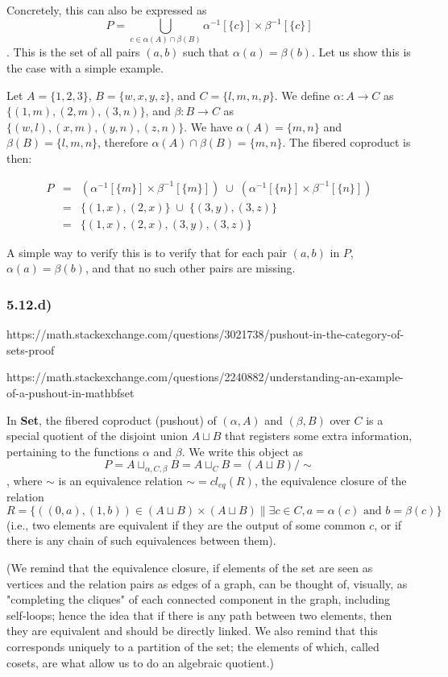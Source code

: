 \documentclass[12pt, letterpaper, twoside]{report}
\begin{document}
Concretely, this can also be expressed as $$P = \bigcup_{c \in \alpha(A) \cap \beta(B)} \alpha^{-1}[\{c\}] \times \beta^{-1}[\{c\}]$$. This is the set of all pairs $(a,b)$ such that $\alpha(a) = \beta(b)$. Let us show this is the case with a simple example.

Let $A = \{1,2,3\}$, $B = \{w, x, y, z\}$, and $C = \{l, m, n, p\}$. We define $\alpha : A \to C$ as $\{(1, m), (2, m), (3, n) \}$, and $\beta : B \to C$ as $\{ (w, l), (x, m), (y, n), (z, n) \}$. We have $\alpha(A) = \{m,n\}$ and $\beta(B) = \{l, m, n\}$, therefore $\alpha(A) \cap \beta(B) = \{m,n\}$. The fibered coproduct is then:

$$
\begin{array}{lll}
P &=& (\alpha^{-1}[\{m\}] \times \beta^{-1}[\{m\}]) \; \cup \; (\alpha^{-1}[\{n\}] \times \beta^{-1}[\{n\}]) \\
  &=& \{ (1,x), (2,x) \} \; \cup \; \{ (3,y), (3,z) \} \\
  &=& \{ (1,x), (2,x), (3,y), (3,z) \}
\end{array}
$$

A simple way to verify this is to verify that for each pair $(a,b)$ in $P$, $\alpha(a) = \beta(b)$, and that no such other pairs are missing.


\subsubsection*{5.12.d)}

https://math.stackexchange.com/questions/3021738/pushout-in-the-category-of-sets-proof

https://math.stackexchange.com/questions/2240882/understanding-an-example-of-a-pushout-in-mathbfset

In \textbf{Set}, the fibered coproduct (pushout) of $(\alpha, A)$ and $(\beta, B)$ over $C$ is a special quotient of the disjoint union $A \sqcup B$ that registers some extra information, pertaining to the functions $\alpha$ and $\beta$. We write this object as $$P = A \sqcup_{\alpha, C, \beta} B = A \sqcup_C B = (A \sqcup B) / \sim$$, where $\sim$ is an equivalence relation $\sim = cl_{eq}(R)$, the equivalence closure of the relation $$R = \{((0, a), (1, b)) \in (A \sqcup B) \times (A \sqcup B) \| \exists c \in C, a = \alpha(c) \text{ and } b = \beta(c) \}$$ (i.e., two elements are equivalent if they are the output of some common $c$, or if there is any chain of such equivalences between them).

(We remind that the equivalence closure, if elements of the set are seen as vertices and the relation pairs as edges of a graph, can be thought of, visually, as "completing the cliques" of each connected component in the graph, including self-loops; hence the idea that if there is any path between two elements, then they are equivalent and should be directly linked. We also remind that this corresponds uniquely to a partition of the set; the elements of which, called cosets, are what allow us to do an algebraic quotient.)
\end{document}
